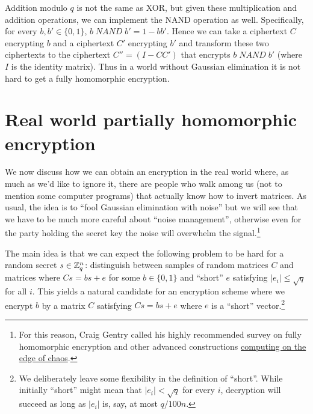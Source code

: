 Addition modulo \(q\) is not the same as XOR, but given these
multiplication and addition operations, we can implement the NAND
operation as well. Specifically, for every \(b,b' \in \{0,1\}\),
\(b \; \ensuremath{\mathit{NAND}} \; b' = 1-bb'\). Hence we can take a
ciphertext \(C\) encrypting \(b\) and a ciphertext \(C'\) encrypting
\(b'\) and transform these two ciphertexts to the ciphertext
\(C''=(I-CC')\) that encrypts \(b\; \ensuremath{\mathit{NAND}} \; b'\)
(where \(I\) is the identity matrix). Thus in a world without Gaussian
elimination it is not hard to get a fully homomorphic encryption.

\hypertarget{privkeyfhe}{}

\section{Real world partially homomorphic
encryption}\label{15-Real-world-partially-h}

We now discuss how we can obtain an encryption in the real world where,
as much as we'd like to ignore it, there are people who walk among us
(not to mention some computer programs) that actually know how to invert
matrices. As usual, the idea is to ``fool Gaussian elimination with
noise'' but we will see that we have to be much more careful about
``noise management'', otherwise even for the party holding the secret
key the noise will overwhelm the signal.\footnote{For this reason, Craig
  Gentry called his highly recommended survey on fully homomorphic
  encryption and other advanced constructions
  \href{https://eprint.iacr.org/2014/610}{computing on the edge of
  chaos}.}

The main idea is that we can expect the following problem to be hard for
a random secret \(s\in{\mathbb{Z}}_q^n\): distinguish between samples of random
matrices \(C\) and matrices where \(Cs = bs + e\) for some
\(b\in\{0,1\}\) and ``short'' \(e\) satisfying \(|e_i| \leq \sqrt{q}\)
for all \(i\). This yields a natural candidate for an encryption scheme
where we encrypt \(b\) by a matrix \(C\) satisfying \(Cs = bs + e\)
where \(e\) is a ``short'' vector.\footnote{We deliberately leave some
  flexibility in the definition of ``short''. While initially ``short''
  might mean that \(|e_i|<\sqrt{q}\) for every \(i\), decryption will
  succeed as long as \(|e_i|\) is, say, at most \(q/100n\).}


